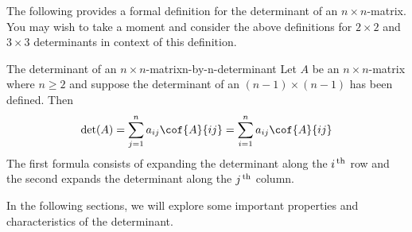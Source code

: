 The following provides a formal definition for the determinant of an
$n\times n$-matrix. You may wish to take a moment and consider the
above definitions for $2\times 2$ and $3\times 3$ determinants in
context of this definition.

\begin{definition}{The determinant of an $n\times n$-matrix}{n-by-n-determinant}
  Let $A$ be an $n\times n$-matrix where $n\geq 2$ and suppose the
  determinant of an $(n-1)\times (n-1) $ has been defined. Then
  \begin{equation*}
    \det(A) =\sum_{j=1}^{n}a_{ij}\cof{A}{ij}=\sum_{i=1}^{n}a_{ij}\cof{A}{ij}
  \end{equation*}
  The first formula consists of expanding the determinant along the
  $i^{\,\rm th}$ row and the second expands the determinant along the
  $j^{\,\rm th}$ column.
\end{definition}

In the following sections, we will explore some important properties
and characteristics of the determinant.
